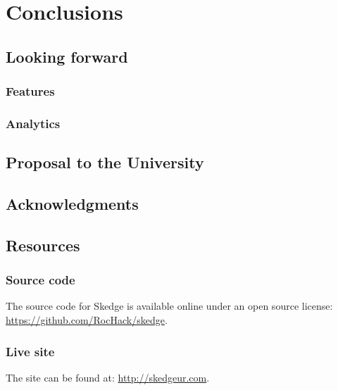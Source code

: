 
\chapter{Conclusions}

\section{Looking forward}

\subsection{Features}

\subsection{Analytics}


\section{Proposal to the University}


\section{Acknowledgments}


\section{Resources}

\subsection*{Source code}

The source code for Skedge is available online under an open source license:\\
\url{https://github.com/RocHack/skedge}.

\subsection*{Live site}

\noindent The site can be found at: \url{http://skedgeur.com}.